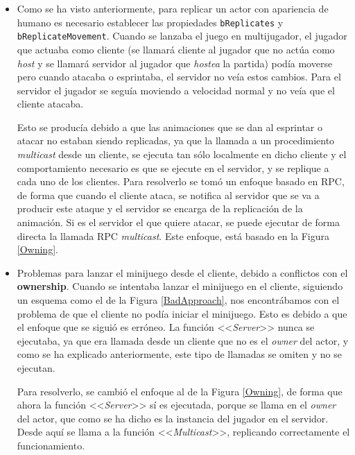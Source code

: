 \begin{itemize}
\item Como se ha visto anteriormente, para replicar un actor con apariencia de humano es necesario establecer las propiedades \texttt{bReplicates} y \texttt{bReplicateMovement}. Cuando se lanzaba el juego en multijugador, el jugador que actuaba como cliente (se llamará cliente al jugador que no actúa como \textit{host} y se llamará servidor al jugador que \textit{hostea} la partida) podía moverse pero cuando atacaba o esprintaba, el servidor no veía estos cambios. Para el servidor el jugador se seguía moviendo a velocidad normal y no veía que el cliente atacaba. 

Esto se producía debido a que las animaciones que se dan al esprintar o atacar no estaban siendo replicadas, ya que la llamada a un procedimiento \textit{multicast} desde un cliente, se ejecuta tan sólo localmente en dicho cliente y el comportamiento necesario es que se ejecute en el servidor, y se replique a cada uno de los clientes. Para resolverlo se tomó un enfoque basado en \ac{RPC}, de forma que cuando el cliente ataca, se notifica al servidor que se va a producir este ataque y el servidor se encarga de la replicación de la animación. Si es el servidor el que quiere atacar, se puede ejecutar de forma directa la llamada \ac{RPC} \textit{multicast}. Este enfoque, está basado en la Figura \ref{Owning}.


\item Problemas para lanzar el minijuego desde el cliente, debido a conflictos con el \textbf{ownership}. Cuando se intentaba lanzar el minijuego en el cliente, siguiendo un esquema como el de la Figura \ref{BadApproach}, nos encontrábamos con el problema de que el cliente no podía iniciar el minijuego. Esto es debido a que el enfoque que se siguió es erróneo. La función <<\textit{Server}>> nunca se ejecutaba, ya que era llamada desde un cliente que no es el \textit{owner} del actor, y como se ha explicado anteriormente, este tipo de llamadas se omiten y no se ejecutan.

Para resolverlo, se cambió el enfoque al de la Figura \ref{Owning}, de forma que ahora la función <<\textit{Server}>> sí es ejecutada, porque se llama en el \textit{owner} del actor, que como se ha dicho es la instancia del jugador en el servidor. Desde aquí se llama a la función <<\textit{Multicast}>>, replicando correctamente el funcionamiento.



\end{itemize}
